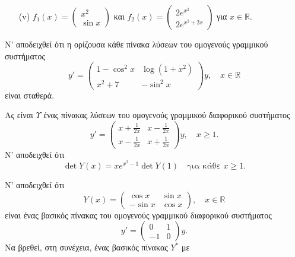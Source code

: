 \documentclass[11pt,a4paper,twoside]{book}
\begin{document}
\begin{askhseis}
\begin{enumerate}
    \item[(v)] $f_1(x) = \begin{pmatrix} x^2 \\ \sin x \end{pmatrix}$ και $f_2(x) = \begin{pmatrix} 2e^{x^2} \\ 2e^{x^2+2x} \end{pmatrix}$ για $x \in \mathbb{R}$.
\end{enumerate}
\item Ν' αποδειχθεί ότι η ορίζουσα κάθε πίνακα λύσεων του ομογενούς γραμμικού συστήματος
\[
y' = \begin{pmatrix} 1-\cos^2 x & \log(1+x^2) \\ x^2+7 & -\sin^2 x \end{pmatrix} y, \quad x \in \mathbb{R}
\]
είναι σταθερά.
\item Ας είναι $Υ$ ένας πίνακας λύσεων του ομογενούς γραμμικού διαφορικού συστήματος
\[
y' = \begin{pmatrix} x+\frac{1}{2x} & x-\frac{1}{2x} \\ x-\frac{1}{2x} & x+\frac{1}{2x} \end{pmatrix} y, \quad x \ge 1.
\]
Ν' αποδειχθεί ότι
\[
\det Y(x) = xe^{x^2-1} \det Y(1) \quad \text{για κάθε } x \ge 1.
\]
\item Ν' αποδειχθεί ότι
\[
Y(x) = \begin{pmatrix} \cos x & \sin x \\ -\sin x & \cos x \end{pmatrix}, \quad x \in \mathbb{R}
\]
είναι ένας βασικός πίνακας του ομογενούς γραμμικού διαφορικού συστήματος
\[
y' = \begin{pmatrix} 0 & 1 \\ -1 & 0 \end{pmatrix} y.
\]
Να βρεθεί, στη συνέχεια, ένας βασικός πίνακας $Y^*$ με



\end{askhseis}
\end{document}
